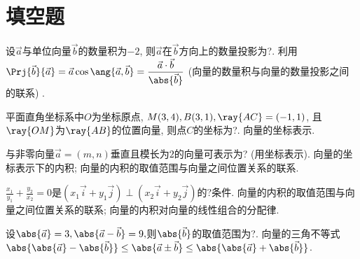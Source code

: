 \documentclass[8pt]{article}
\author{\Author}
\title{\Title}
\date{}
\begin{document}
	\maketitle

	\tableofcontents

	\section{填空题}
		\begin{easonproblem}
			设\(\vec{a}\)与单位向量\(\vec{b}\)的数量积为\(-2\), 则\(\vec{a}\)在\(\vec{b}\)方向上的数量投影为?.
			\subproblem
			 利用\(\displaystyle \Prj{\vec{b}}{\vec{a}} = \vec{a} \cos \ang{\vec{a}, \vec{b}} = \frac{\vec{a} \cdot \vec{b}}{\abs{\vec{b}}}\) (向量的数量积与向量的数量投影之间的联系) \cite{linearalgebra-tj}.
		\end{easonproblem}

		\begin{easonproblem}
			平面直角坐标系中\(O\)为坐标原点, \(M(3, 4), B(3, 1), \ray{AC} = (-1, 1)\), 且\(\ray{OM}\)为\(\ray{AB}\)的位置向量, 则点\(C\)的坐标为?.
			\subproblem
			 向量的坐标表示.
		\end{easonproblem}

		\begin{easonproblem}
			与非零向量\(\vec{a} = (m, n)\)垂直且模长为\(2\)的向量可表示为? (用坐标表示).
			\subproblem
			 向量的坐标表示下的内积; 向量的内积的取值范围与向量之间位置关系的联系.
		\end{easonproblem}

		\begin{easonproblem}
			\(\frac{x_1}{y_1} + \frac{y_2}{x_2} = 0\)是\(\left(x_1 \vec{i} + y_1 \vec{j}\right)\perp \left(x_2 \vec{i} + y_2 \vec{j}\right)\)的?条件.  \cite{owenxuanswer}
			\subproblem
			 向量的内积的取值范围与向量之间位置关系的联系; 向量的内积对向量的线性组合的分配律. 
		\end{easonproblem}

		\begin{easonproblem}
			设\(\abs{\vec{a}} = 3, \abs{\vec{a} - \vec{b}} = 9,\)则\(\abs{\vec{b}}\)的取值范围为?.
			\subproblem
			 向量的三角不等式 \(\abs{\abs{\vec{a}} - \abs{\vec{b}}} \leq \abs{\vec{a} \pm \vec{b}} \leq \abs{\abs{\vec{a}} + \abs{\vec{b}}}\).
		\end{easonproblem}
\end{document}
